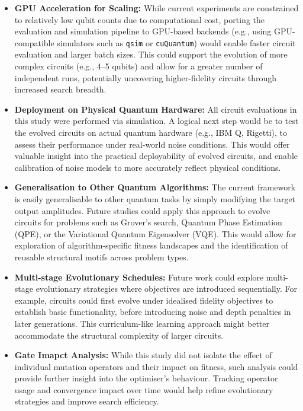 \documentclass[11pt,a4paper]{article}
\begin{document}
\begin{itemize}
    \item \textbf{GPU Acceleration for Scaling:} While current experiments are constrained to relatively low qubit counts due to computational cost, porting the evaluation and simulation pipeline to GPU-based backends (e.g., using GPU-compatible simulators such as \texttt{qsim} or \texttt{cuQuantum}) would enable faster circuit evaluation and larger batch sizes. This could support the evolution of more complex circuits (e.g., 4–5 qubits) and allow for a greater number of independent runs, potentially uncovering higher-fidelity circuits through increased search breadth.
    
    \item \textbf{Deployment on Physical Quantum Hardware:} All circuit evaluations in this study were performed via simulation. A logical next step would be to test the evolved circuits on actual quantum hardware (e.g., IBM Q, Rigetti), to assess their performance under real-world noise conditions. This would offer valuable insight into the practical deployability of evolved circuits, and enable calibration of noise models to more accurately reflect physical conditions.

    \item \textbf{Generalisation to Other Quantum Algorithms:} The current framework is easily generalisable to other quantum tasks by simply modifying the target output amplitudes. Future studies could apply this approach to evolve circuits for problems such as Grover's search, Quantum Phase Estimation (QPE), or the Variational Quantum Eigensolver (VQE). This would allow for exploration of algorithm-specific fitness landscapes and the identification of reusable structural motifs across problem types.

    \item \textbf{Multi-stage Evolutionary Schedules:} Future work could explore multi-stage evolutionary strategies where objectives are introduced sequentially. For example, circuits could first evolve under idealised fidelity objectives to establish basic functionality, before introducing noise and depth penalties in later generations. This curriculum-like learning approach might better accommodate the structural complexity of larger circuits.

    \item \textbf{Gate Imapct Analysis:} While this study did not isolate the effect of individual mutation operators and their impact on fitness, such analysis could provide further insight into the optimiser’s behaviour. Tracking operator usage and convergence impact over time would help refine evolutionary strategies and improve search efficiency.
\end{itemize}
\end{document}
